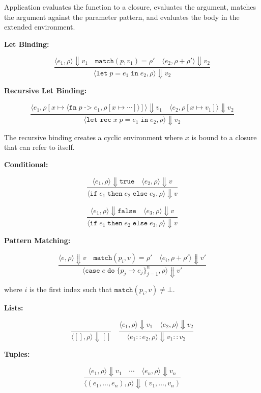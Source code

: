 \documentclass[conference,onecolumn]{IEEEtran}
\begin{document}
Application evaluates the function to a closure, evaluates the argument, matches the argument against the parameter pattern, and evaluates the body in the extended environment.

\textbf{Let Binding:}

$$\frac{\langle e_1, \rho \rangle \Downarrow v_1 \quad \texttt{match}(p, v_1) = \rho' \quad \langle e_2, \rho + \rho' \rangle \Downarrow v_2}{\langle \texttt{let} \; p = e_1 \; \texttt{in} \; e_2, \rho \rangle \Downarrow v_2}$$

\textbf{Recursive Let Binding:}

$$\frac{\langle e_1, \rho[x \mapsto \langle \texttt{fn} \; p \; \texttt{->} \; e_1, \rho[x \mapsto \cdots] \rangle] \rangle \Downarrow v_1 \quad \langle e_2, \rho[x \mapsto v_1] \rangle \Downarrow v_2}{\langle \texttt{let rec} \; x \; p = e_1 \; \texttt{in} \; e_2, \rho \rangle \Downarrow v_2}$$

The recursive binding creates a cyclic environment where $x$ is bound to a closure that can refer to itself.

\textbf{Conditional:}

$$\frac{\langle e_1, \rho \rangle \Downarrow \texttt{true} \quad \langle e_2, \rho \rangle \Downarrow v}{\langle \texttt{if} \; e_1 \; \texttt{then} \; e_2 \; \texttt{else} \; e_3, \rho \rangle \Downarrow v}$$

$$\frac{\langle e_1, \rho \rangle \Downarrow \texttt{false} \quad \langle e_3, \rho \rangle \Downarrow v}{\langle \texttt{if} \; e_1 \; \texttt{then} \; e_2 \; \texttt{else} \; e_3, \rho \rangle \Downarrow v}$$

\textbf{Pattern Matching:}

$$\frac{\langle e, \rho \rangle \Downarrow v \quad \texttt{match}(p_i, v) = \rho' \quad \langle e_i, \rho + \rho' \rangle \Downarrow v'}{\langle \texttt{case} \; e \; \texttt{do} \; \{p_j \rightarrow e_j\}_{j=1}^{n}, \rho \rangle \Downarrow v'}$$

where $i$ is the first index such that $\texttt{match}(p_i, v) \neq \bot$.

\textbf{Lists:}

$$\frac{}{\langle [], \rho \rangle \Downarrow []}
\quad
\frac{\langle e_1, \rho \rangle \Downarrow v_1 \quad \langle e_2, \rho \rangle \Downarrow v_2}{\langle e_1 :: e_2, \rho \rangle \Downarrow v_1 :: v_2}$$

\textbf{Tuples:}

$$\frac{\langle e_1, \rho \rangle \Downarrow v_1 \quad \cdots \quad \langle e_n, \rho \rangle \Downarrow v_n}{\langle (e_1, \ldots, e_n), \rho \rangle \Downarrow (v_1, \ldots, v_n)}$$
\end{document}
